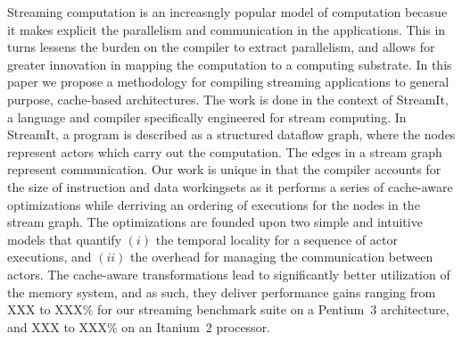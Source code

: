 
Streaming computation is an increasngly popular model of computation
becasue it makes explicit the parallelism and communication in the
applications. This in turns lessens the burden on the compiler to
extract parallelism, and allows for greater innovation in mapping the
computation to a computing substrate. In this paper we propose a
methodology for compiling streaming applications to general purpose,
cache-based architectures. The work is done in the context of
StreamIt, a language and compiler specifically engineered for stream
computing. In StreamIt, a program is described as a structured dataflow
graph, where the nodes represent actors which carry out the
computation. The edges in a stream graph represent
communication. Our work is unique in that the compiler
accounts for the size of instruction and data workingsets as it
performs a series of cache-aware optimizations while derriving an
ordering of executions for the nodes in the stream graph. The
optimizations are founded upon two simple and intuitive models that
quantify $(i)$ the temporal locality for a sequence of  actor
executions, and $(ii)$ the overhead for managing the communication
between actors. The cache-aware transformations lead to significantly
better utilization of the memory system, and as such, they deliver
performance gains ranging from XXX to XXX\% for our streaming
benchmark suite on a Pentium~3 architecture, and XXX to XXX\% on an
Itanium~2 processor.
